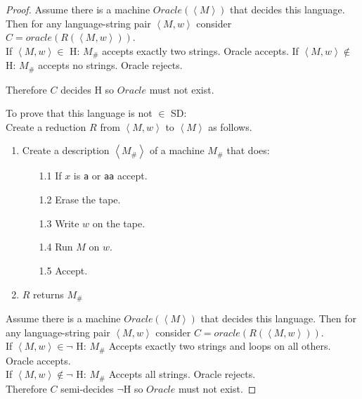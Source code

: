 \documentclass[10pt]{article}
\newcommand{\brackets}[1]{\left< #1 \right>}
\begin{document}
\begin{enumerate}[1)]
\begin{enumerate}[a)]
\begin{proof}[Proof]
Assume there is a machine $Oracle(\brackets{M})$ that decides this language.  Then for any language-string pair $\brackets{M, w}$ consider $C = oracle(R(\brackets{M, w}))$.\\

If $\brackets{M, w} \in$ H: $M_\#$ accepts exactly two strings. Oracle accepts.
If $\brackets{M, w} \not \in$ H: $M_\#$ accepts no strings.  Oracle rejects.

Therefore $C$ decides H so $Oracle$ must not exist.

\newpage
To prove that this language is not $\in$ SD:\\

Create a reduction $R$ from $\brackets{M, w}$ to $\brackets{M}$ as follows.
\begin{enumerate}[1.]
\item
Create a description $\brackets{M_\#}$ of a machine $M_\#$ that does:
\begin{enumerate}
\item[1.1]
If $x$ is \texttt{a} or \texttt{aa} accept.

\item[1.2]
Erase the tape.

\item[1.3]
Write $w$ on the tape.

\item[1.4]
Run $M$ on $w$.

\item[1.5]
Accept.
\end{enumerate}
\item
$R$ returns $M_\#$\\
\end{enumerate}

Assume there is a machine $Oracle(\brackets{M})$ that decides this language.  Then for any language-string pair $\brackets{M, w}$ consider $C = oracle(R(\brackets{M, w}))$.\\

If $\brackets{M, w} \in \lnot$ H: $M_\#$ Accepts exactly two strings and loops on all others.  Oracle accepts.\\
If $\brackets{M, w} \not \in \lnot$ H: $M_\#$ Accepts all strings.  Oracle rejects.\\

Therefore $C$ semi-decides $\lnot$H so $Oracle$ must not exist.
\end{proof}


\end{enumerate}
\end{enumerate}
\end{document}
